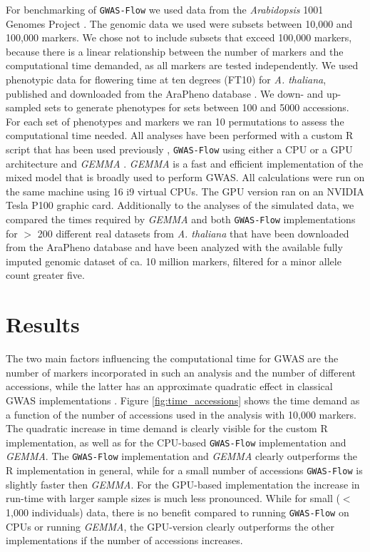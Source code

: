 For benchmarking of \texttt{GWAS-Flow} we used data from the \textit{Arabidopsis} 1001 Genomes Project
\cite{1001genome}. The genomic data we used were subsets between 10,000 and 100,000 markers. We chose not to
include subsets that exceed 100,000 markers, because there is a linear relationship between the number of
markers and the computational time demanded, as all markers are tested independently. We used phenotypic data
for flowering time at ten degrees (FT10) for \textit{A. thaliana}, published and downloaded from the AraPheno
database \cite{seren2016arapheno}. We down- and up-sampled sets to generate phenotypes for sets between 100
and 5000 accessions. For each set of phenotypes and markers we ran 10 permutations to assess the
computational time needed. All analyses have been performed with a custom R script that has been used
previously \cite{togninalli2017aragwas}, \texttt{GWAS-Flow} using either a CPU or a GPU architecture and
\textit{GEMMA} \cite{Zhou2012}. \textit{GEMMA} is a fast and efficient implementation of the mixed model that
is broadly used to perform GWAS. All calculations were run on the same machine using 16 i9 virtual CPUs. The
GPU version ran on an NVIDIA Tesla P100 graphic card. Additionally to the analyses of the simulated data, we
compared the times required by \textit{GEMMA} and both \texttt{GWAS-Flow} implementations for $>$ 200
different real datasets from \textit{A. thaliana} that have been downloaded from the AraPheno
\cite{seren2016arapheno} database and have been analyzed with the available fully imputed genomic dataset of
ca. 10 million markers, filtered for a minor allele count greater five.

\section{Results}

The two main factors influencing the computational time for GWAS are the number of markers incorporated in
such an analysis and the number of different accessions, while the latter has an approximate quadratic effect
in classical GWAS implementations \cite{Zhou2012}. Figure \ref{fig:time_accessions} shows the time demand as a
function of the number of accessions used in the analysis with 10,000 markers. The quadratic increase in time
demand is clearly visible for the custom R implementation, as well as for the CPU-based \texttt{GWAS-Flow}
implementation and \textit{GEMMA}. The \texttt{GWAS-Flow} implementation and \textit{GEMMA} clearly
outperforms the R implementation in general, while for a small number of accessions \texttt{GWAS-Flow} is
slightly faster then \textit{GEMMA}. For the GPU-based implementation the increase in run-time with larger
sample sizes is much less pronounced. While for small ($<$ 1,000 individuals) data, there is no benefit
compared to running \texttt{GWAS-Flow} on CPUs or running \textit{GEMMA}, the GPU-version clearly outperforms
the other implementations if the number of accessions increases. 

